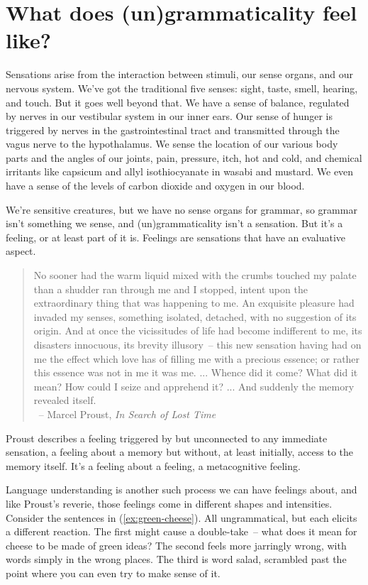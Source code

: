 \section{What does (un)grammaticality feel like?}

Sensations arise from the interaction between stimuli, our sense organs, and our nervous system. We've got the traditional five senses: sight, taste, smell, hearing, and touch. But it goes well beyond that. We have a sense of balance, regulated by nerves in our vestibular system in our inner ears. Our sense of hunger is triggered by nerves in the gastrointestinal tract and transmitted through the vagus nerve to the hypothalamus. We sense the location of our various body parts and the angles of our joints, pain, pressure, itch, hot and cold, and chemical irritants like capsicum and allyl isothiocyanate in wasabi and mustard. We even have a sense of the levels of carbon dioxide and oxygen in our blood.

We're sensitive creatures, but we have no sense organs for grammar, so grammar isn't something we sense, and (un)grammaticality isn't a sensation. But it's a feeling, or at least part of it is. Feelings are sensations that have an evaluative aspect.

\begin{quote}
    No sooner had the warm liquid mixed with the crumbs touched my palate than a shudder ran through me and I stopped, intent upon the extraordinary thing that was happening to me. An exquisite pleasure had invaded my senses, something isolated, detached, with no suggestion of its origin. And at once the vicissitudes of life had become indifferent to me, its disasters innocuous, its brevity illusory~-- this new sensation having had on me the effect which love has of filling me with a precious essence; or rather this essence was not in me it was me. ... Whence did it come? What did it mean? How could I seize and apprehend it? ... And suddenly the memory revealed itself. \\\hfill~-- Marcel Proust, \textit{In Search of Lost Time}
\end{quote}

Proust describes a feeling triggered by but unconnected to any immediate sensation, a feeling about a memory but without, at least initially, access to the memory itself. It's a feeling about a feeling, a metacognitive feeling.

Language understanding is another such process we can have feelings about, and like Proust's reverie, those feelings come in different shapes and intensities. Consider the sentences in (\ref{ex:green-cheese}). All ungrammatical, but each elicits a different reaction. The first might cause a double-take~-- what does it mean for cheese to be made of green ideas? The second feels more jarringly wrong, with words simply in the wrong places. The third is word salad, scrambled past the point where you can even try to make sense of it.


